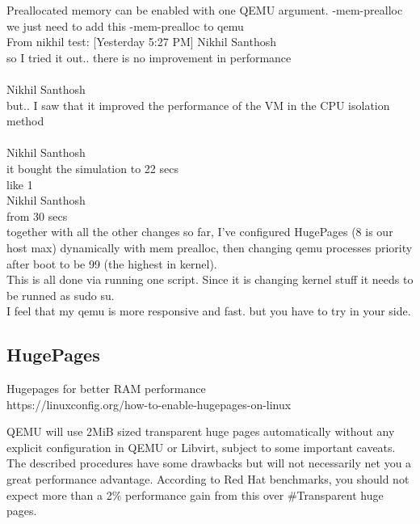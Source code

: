 \documentclass[11pt, a4paper, oneside]{article}
\theoremstyle{definition}
\begin{document}
Preallocated memory can be enabled with one QEMU argument. -mem-prealloc\\

we just need to add this -mem-prealloc to qemu\\

From nikhil test:
[Yesterday 5:27 PM] Nikhil Santhosh\\
so I tried it out.. there is no improvement in performance\\
\\
Nikhil Santhosh\\
but.. I saw that it improved the performance of the VM in the CPU isolation method\\
\\
Nikhil Santhosh\\
it bought the simulation to 22 secs\\
 like 1\\

Nikhil Santhosh\\
from 30 secs\\

together with all the other changes so far, I've configured HugePages (8 is our host max) dynamically with mem prealloc, then changing qemu processes priority after boot to be 99 (the highest in kernel).\\

This is all done via running one script. Since it is changing kernel stuff it needs to be runned as sudo su.\\

I feel that my qemu is more responsive and fast. but you have to try in your side.\\

\subsection{HugePages}
Hugepages for better RAM performance\\
https://linuxconfig.org/how-to-enable-hugepages-on-linux

QEMU will use 2MiB sized transparent huge pages automatically without any explicit configuration in QEMU or Libvirt, subject to some important caveats.\\

The described procedures have some drawbacks but will not necessarily net you a great performance advantage. According to Red Hat benchmarks, you should not expect more than a 2$\%$ performance gain from this over $\#$Transparent huge pages.\\
\end{document}
